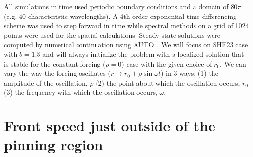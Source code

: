 \documentclass[pre,preprint,superscriptaddress]{revtex4-1}
\begin{document}
All simulations in time used periodic boundary conditions and a domain of $80\pi$ (e.g. 40 characteristic wavelengths).  A 4th order exponential time differencing scheme\cite{cox2002} was used to step forward  in time while spectral methods on a grid of 1024 points were used for the spatial calculations.  Steady state solutions were computed by numerical continuation using AUTO~\cite{doedel1981auto}.   We will focus on SHE23 case with $b=1.8$ and will always initialize the problem with a localized solution that is stable for the constant forcing ($\rho=0$) case with the given choice of $r_0$.   We can vary the way the forcing oscillates ($r\rightarrow r_0+\rho \sin\omega t$) in 3 ways: (1) the amplitude of the oscillation, $\rho$ (2) the point about which the oscillation occurs, $r_0$ (3) the frequency with which the oscillation occurs, $\omega$.

\section{Front speed just outside of the pinning region}
\end{document}
